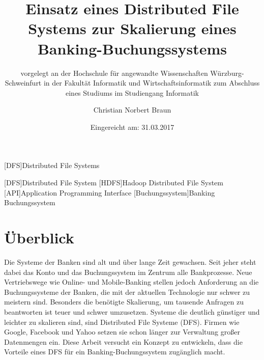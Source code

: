 \documentclass[12pt,oneside,a4paper,parskip]{scrbook}
\def\BaAuthor{Christian Norbert Braun}
\def\BaTitle{Einsatz eines Distributed File Systems zur Skalierung eines Banking-Buchungssystems}
\def\BaSupervisorOne{Prof.\ Dr.\ Steffen Heinzl}
\def\BaSupervisorTwo{Prof.\ Dr.\ Peter Braun}
\def\BaDeadline{31.03.2017}
\begin{document}
[DFS]{Distributed File Systems}

\begin{acronym}
  [DFS]{Distributed File System}
  [HDFS]{Hadoop Distributed File System}
  [API]{Application Programming Interface}
  [Buchungssystem]{Banking Buchungssystem}
\end{acronym}




\frontmatter
\titlehead{%
  {Hochschule für angewandte Wissenschaften Würzburg-Schweinfurt\\
   Fakultät Informatik und Wirtschaftsinformatik}}
\subject{Bachelorarbeit}
\title{\BaTitle\\[15mm]}
\subtitle{\normalsize{vorgelegt an der Hochschule f\"{u}r angewandte Wissenschaften W\"{u}rzburg-Schweinfurt in der Fakult\"{a}t Informatik und Wirtschaftsinformatik zum Abschluss eines Studiums im Studiengang Informatik}}
\author{\BaAuthor}
\date{\normalsize{Eingereicht am: \BaDeadline}}
\publishers{
  \normalsize{Erstpr\"{u}fer: \BaSupervisorOne}\\
  \normalsize{Zweitpr\"{u}fer: \BaSupervisorTwo}\\
}


\maketitle


\section*{Überblick}
Die Systeme der Banken sind alt und über lange Zeit gewachsen. Seit jeher steht dabei das Konto und das Buchungssystem im Zentrum alle Bankprozesse. Neue Vertriebswege wie Online- und Mobile-Banking stellen jedoch Anforderung an die Buchungssysteme der Banken, die mit der aktuellen Technologie nur schwer zu meistern sind. Besonders die benötigte Skalierung, um tausende Anfragen zu beantworten ist teuer und schwer umzusetzen. Systeme die deutlich günstiger und leichter zu skalieren sind, sind Distributed File Systeme (DFS). Firmen wie Google, Facebook und Yahoo setzen sie schon länger zur Verwaltung großer Datenmengen ein. Diese Arbeit versucht ein Konzept zu entwickeln, dass die Vorteile eines DFS für ein Banking-Buchungssystem zugänglich macht.
\end{document}
